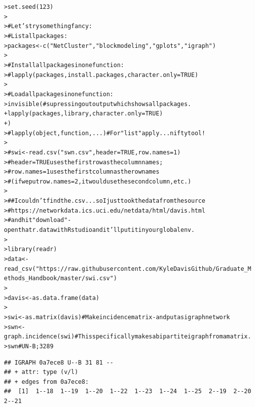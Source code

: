 \documentclass[12pt]{article}\usepackage[]{graphicx}\usepackage[]{color}
\makeatletter
\newcommand{\hlnum}[1]{\textcolor[rgb]{0.82,0.78,0.62}{#1}}%
\newcommand{\hlstr}[1]{\textcolor[rgb]{0.82,0.78,0.62}{#1}}%
\newcommand{\hlcom}[1]{\textcolor[rgb]{0.404,0.408,0.42}{#1}}%
\newcommand{\hlstd}[1]{\textcolor[rgb]{0.882,0.878,0.898}{#1}}%
\newcommand{\hlkwb}[1]{\textcolor[rgb]{0.902,0.675,0.196}{#1}}%
\newcommand{\hlkwc}[1]{\textcolor[rgb]{0.812,0.522,0.388}{#1}}%
\newcommand{\hlkwd}[1]{\textcolor[rgb]{0.733,0.388,0.812}{#1}}%
\newenvironment{kframe}{%
 \def\at@end@of@kframe{}%
 \ifinner\ifhmode%
  \def\at@end@of@kframe{\end{minipage}}%
  \begin{minipage}{\columnwidth}%
 \fi\fi%
 \def\FrameCommand##1{\hskip\@totalleftmargin \hskip-\fboxsep
 \colorbox{shadecolor}{##1}\hskip-\fboxsep
     \hskip-\linewidth \hskip-\@totalleftmargin \hskip\columnwidth}%
 \MakeFramed {\advance\hsize-\width
   \@totalleftmargin\z@ \linewidth\hsize
   \@setminipage}}%
 {\par\unskip\endMakeFramed%
 \at@end@of@kframe}
\newenvironment{knitrout}{}{} %
\makeatother
\begin{document}
\begin{flushleft}
\begin{center}
\begin{knitrout}
\color{fgcolor}\begin{kframe}
\begin{alltt}
\hlstd{> }\hlkwd{set.seed}\hlstd{(}\hlnum{123}\hlstd{)}
\hlstd{> }
\hlstd{> }\hlcom{# Let's try something fancy:}
\hlstd{> }\hlcom{# List all packages:}
\hlstd{> }\hlstd{packages} \hlkwb{<-} \hlkwd{c}\hlstd{(}\hlstr{"NetCluster"}\hlstd{,} \hlstr{"blockmodeling"}\hlstd{,} \hlstr{"gplots"}\hlstd{,} \hlstr{"igraph"}\hlstd{)}
\hlstd{> }
\hlstd{> }\hlcom{# Install all packages in one function:}
\hlstd{> }\hlcom{#   lapply(packages, install.packages, character.only = TRUE)}
\hlstd{> }
\hlstd{> }\hlcom{# Load all packages in one function:}
\hlstd{> }\hlkwd{invisible}\hlstd{(} \hlcom{# supressing out output which shows all packages.}
\hlstd{+ }\hlkwd{lapply}\hlstd{(packages, library,} \hlkwc{character.only} \hlstd{=} \hlnum{TRUE}\hlstd{)}
\hlstd{+ }\hlstd{)}
\hlstd{> }\hlcom{#  lapply(object, function, ...)  # For "list" apply... nifty tool!}
\hlstd{> }
\hlstd{> }\hlcom{# swi <- read.csv("swn.csv", header = TRUE, row.names = 1)}
\hlstd{> }\hlcom{# header = TRUE uses the first row as the column names;}
\hlstd{> }\hlcom{#  row.names = 1 uses the first column as the row names}
\hlstd{> }\hlcom{#    (if we put row.names = 2, it would use the second column, etc.)}
\hlstd{> }
\hlstd{> }\hlcom{## I couldn't find the .csv... so I just took the data from the source}
\hlstd{> }\hlcom{# https://networkdata.ics.uci.edu/netdata/html/davis.html}
\hlstd{> }\hlcom{#  and hit "download" - open that r.data with Rstudio and it'll put it in your global env.}
\hlstd{> }
\hlstd{> }\hlkwd{library}\hlstd{(readr)}
\hlstd{> }\hlstd{data} \hlkwb{<-} \hlkwd{read_csv}\hlstd{(}\hlstr{"https://raw.githubusercontent.com/KyleDavisGithub/Graduate_Methods_Handbook/master/swi.csv"}\hlstd{)}
\hlstd{> }
\hlstd{> }\hlstd{davis} \hlkwb{<-} \hlkwd{as.data.frame}\hlstd{(data)}
\hlstd{> }
\hlstd{> }\hlstd{swi} \hlkwb{<-} \hlkwd{as.matrix}\hlstd{(davis)} \hlcom{# Make incidence matrix - and put as igraph network}
\hlstd{> }\hlstd{swn} \hlkwb{<-} \hlkwd{graph.incidence}\hlstd{(swi)} \hlcom{# This specifically makes a bipartite igraph from a matrix.}
\hlstd{> }\hlstd{swn} \hlcom{# UN-B ; 32 89}
\end{alltt}
\begin{verbatim}
## IGRAPH 0a7ece8 U--B 31 81 -- 
## + attr: type (v/l)
## + edges from 0a7ece8:
##  [1]  1--18  1--19  1--20  1--22  1--23  1--24  1--25  2--19  2--20  2--21

\end{verbatim}
\end{kframe}
\end{knitrout}
\end{center}
\end{flushleft}
\end{document}

